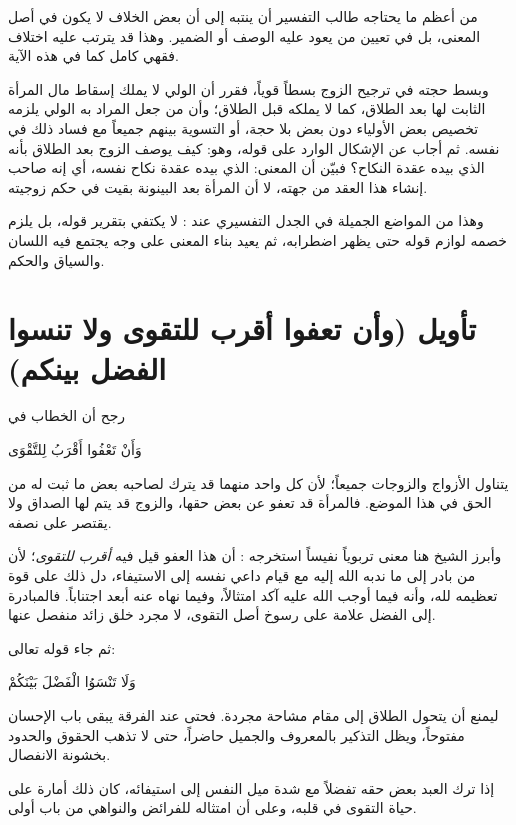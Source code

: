 \begin{fawaid}
من أعظم ما يحتاجه طالب التفسير أن ينتبه إلى أن بعض الخلاف لا يكون في أصل المعنى، بل في تعيين من يعود عليه الوصف أو الضمير. وهذا قد يترتب عليه اختلاف فقهي كامل كما في هذه الآية.
\end{fawaid}

وبسط  حجته في ترجيح الزوج بسطاً قوياً، فقرر أن الولي لا يملك إسقاط مال المرأة الثابت لها بعد الطلاق، كما لا يملكه قبل الطلاق؛ وأن من جعل المراد به الولي يلزمه تخصيص بعض الأولياء دون بعض بلا حجة، أو التسوية بينهم جميعاً مع فساد ذلك في نفسه. ثم أجاب عن الإشكال الوارد على قوله، وهو: كيف يوصف الزوج بعد الطلاق بأنه الذي بيده عقدة النكاح؟ فبيّن أن المعنى: الذي بيده عقدة نكاح نفسه، أي إنه صاحب إنشاء هذا العقد من جهته، لا أن المرأة بعد البينونة بقيت في حكم زوجيته.

وهذا من المواضع الجميلة في الجدل التفسيري عند : لا يكتفي بتقرير قوله، بل يلزم خصمه لوازم قوله حتى يظهر اضطرابه، ثم يعيد بناء المعنى على وجه يجتمع فيه اللسان والسياق والحكم.

\section{تأويل (وأن تعفوا أقرب للتقوى ولا تنسوا الفضل بينكم)}
رجح  أن الخطاب في \begin{ayah}وَأَنْ تَعْفُوا أَقْرَبُ لِلتَّقْوَى\end{ayah} يتناول الأزواج والزوجات جميعاً؛ لأن كل واحد منهما قد يترك لصاحبه بعض ما ثبت له من الحق في هذا الموضع. فالمرأة قد تعفو عن بعض حقها، والزوج قد يتم لها الصداق ولا يقتصر على نصفه.

وأبرز الشيخ هنا معنى تربوياً نفيساً استخرجه : أن هذا العفو قيل فيه \textit{أقرب للتقوى}؛ لأن من بادر إلى ما ندبه الله إليه مع قيام داعي نفسه إلى الاستيفاء، دل ذلك على قوة تعظيمه لله، وأنه فيما أوجب الله عليه آكد امتثالاً، وفيما نهاه عنه أبعد اجتناباً. فالمبادرة إلى الفضل علامة على رسوخ أصل التقوى، لا مجرد خلق زائد منفصل عنها.

ثم جاء قوله تعالى: \begin{ayah}وَلَا تَنْسَوُا الْفَضْلَ بَيْنَكُمْ\end{ayah} ليمنع أن يتحول الطلاق إلى مقام مشاحة مجردة. فحتى عند الفرقة يبقى باب الإحسان مفتوحاً، ويظل التذكير بالمعروف والجميل حاضراً، حتى لا تذهب الحقوق والحدود بخشونة الانفصال.

\begin{fawaid}
إذا ترك العبد بعض حقه تفضلاً مع شدة ميل النفس إلى استيفائه، كان ذلك أمارة على حياة التقوى في قلبه، وعلى أن امتثاله للفرائض والنواهي من باب أولى.
\end{fawaid}

